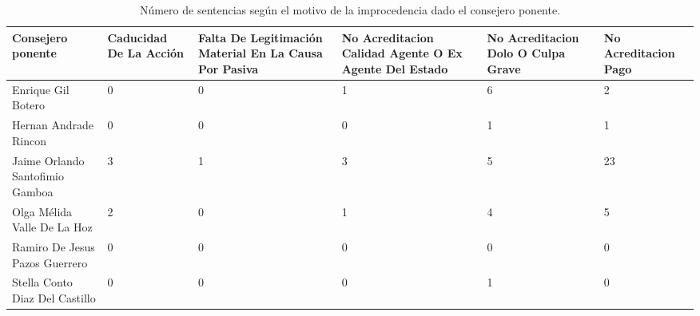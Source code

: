 \begin{table}[!htbp]
\centering
\caption{Número de sentencias según el motivo de la improcedencia dado el consejero ponente.} 
\label{tab:consejeroimpro}
\begin{tabular}{p{2.5cm}R{2.5cm}R{2.5cm}R{2.5cm}R{2.5cm}R{2.5cm}}
  \hline
Consejero ponente & Caducidad De La Acción & Falta De Legitimación Material En La Causa Por Pasiva & No Acreditacion Calidad Agente O Ex Agente Del Estado & No Acreditacion Dolo O Culpa Grave & No Acreditacion Pago \\ 
  \hline
Enrique Gil Botero &  0 &  0 &  1 &  6 &  2 \\ 
  Hernan Andrade Rincon &  0 &  0 &  0 &  1 &  1 \\ 
  Jaime Orlando Santofimio Gamboa &  3 &  1 &  3 &  5 & 23 \\ 
  Olga Mélida Valle De La Hoz &  2 &  0 &  1 &  4 &  5 \\ 
  Ramiro De Jesus Pazos Guerrero &  0 &  0 &  0 &  0 &  0 \\ 
  Stella Conto Diaz Del Castillo &  0 &  0 &  0 &  1 &  0 \\ 
   \hline
\end{tabular}
\end{table}
